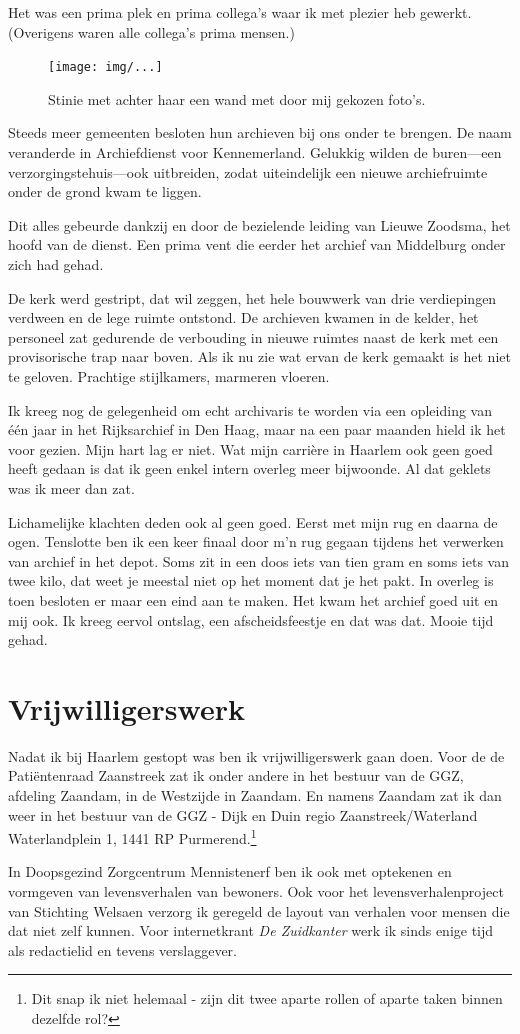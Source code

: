 \documentclass[12pt,twoside, openright]{memoir}
\begin{document}
Het was een prima plek en prima collega’s waar ik met plezier heb gewerkt. (Overigens waren alle collega’s prima mensen.)

\begin{figure}[t]
\texttt{[image: img/...]}
\caption{Stinie met achter haar een wand met door mij gekozen foto's.}
\end{figure}

Steeds meer gemeenten besloten hun archieven bij ons onder te brengen. De naam veranderde in Archiefdienst voor Kennemerland. Gelukkig wilden de buren---een verzorgingstehuis---ook uitbreiden, zodat uiteindelijk een nieuwe archiefruimte onder de grond kwam te liggen. 

Dit alles gebeurde dankzij en door de bezielende leiding van Lieuwe Zoodsma, het hoofd van de dienst. Een prima vent die eerder het archief van Middelburg onder zich had gehad.

De kerk werd gestript, dat wil zeggen, het hele bouwwerk van drie verdiepingen verdween en de lege ruimte ontstond. De archieven kwamen in de kelder, het personeel zat gedurende de verbouding in nieuwe ruimtes naast de kerk met een provisorische trap naar boven. Als ik nu zie wat ervan de kerk gemaakt is het niet te geloven. Prachtige stijlkamers, marmeren vloeren.

Ik kreeg nog de gelegenheid om echt archivaris te worden via een opleiding van één jaar in het Rijksarchief in Den Haag, maar na een paar maanden hield ik het voor gezien. Mijn hart lag er niet. Wat mijn carrière in Haarlem ook geen goed heeft gedaan is dat ik geen enkel intern overleg meer bijwoonde. Al dat geklets was ik meer dan zat. 

Lichamelijke klachten deden ook al geen goed. Eerst met mijn rug en daarna de ogen. Tenslotte ben ik een keer finaal door m’n rug gegaan tijdens het verwerken van archief in het depot. Soms zit in een doos iets van tien gram en soms iets van twee kilo, dat weet je meestal niet op het moment dat je het pakt. In overleg is toen besloten er maar een eind aan te maken. Het kwam het archief goed uit en mij ook. Ik kreeg eervol ontslag, een afscheidsfeestje en dat was dat. Mooie tijd gehad.

\chapter{Vrijwilligerswerk} %
\label{cha:vrijwilligerswerk}

Nadat ik bij Haarlem gestopt was ben ik vrijwilligerswerk gaan doen. Voor de de Patiëntenraad Zaanstreek zat ik onder andere in het bestuur van de GGZ, afdeling Zaandam, in de Westzijde in Zaandam. En namens Zaandam zat ik dan weer in het bestuur van de GGZ - Dijk en Duin regio Zaanstreek/Waterland Waterlandplein 1, 1441 RP Purmerend.\footnote{Dit snap ik niet helemaal - zijn dit twee aparte rollen of aparte taken binnen dezelfde rol?} 

In Doopsgezind Zorgcentrum Mennistenerf ben ik ook met optekenen en vormgeven van levensverhalen van bewoners. Ook voor het levensverhalenproject van Stichting Welsaen verzorg ik geregeld de layout van verhalen voor mensen die dat niet zelf kunnen. Voor internetkrant \emph{De Zuidkanter} werk ik sinds enige tijd als redactielid en tevens verslaggever.
\end{document}
